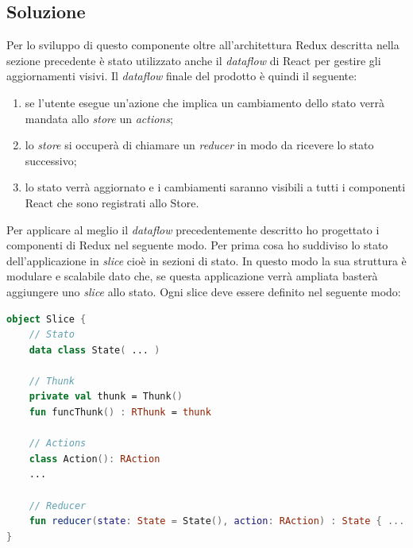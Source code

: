 \subsection{Soluzione}
Per lo sviluppo di questo componente oltre all'architettura Redux descritta nella sezione precedente è stato utilizzato anche il \emph{dataflow} di React per gestire gli aggiornamenti visivi. Il \emph{dataflow} finale del prodotto è quindi il seguente:
\begin{enumerate}
	\item se l'utente esegue un'azione che implica un cambiamento dello stato verrà mandata allo \emph{store} un \emph{actions};
	\item lo \emph{store} si occuperà di chiamare un \emph{reducer} in modo da ricevere lo stato successivo;
	\item lo stato verrà aggiornato e i cambiamenti saranno visibili a tutti i componenti React che sono registrati allo Store.
\end{enumerate}
Per applicare al meglio il \emph{dataflow} precedentemente descritto ho progettato i componenti di Redux nel seguente modo. Per prima cosa ho suddiviso lo stato dell'applicazione in \emph{slice} cioè in sezioni di stato. In questo modo la sua struttura è modulare e scalabile dato che, se questa applicazione verrà ampliata basterà aggiungere uno \emph{slice} allo stato. Ogni slice deve essere definito nel seguente modo:
\begin{lstlisting}[caption={Esempio Slice}, label={lst:slice_state}, language=Kotlin]
object Slice {
	// Stato
	data class State( ... )
	
	// Thunk
	private val thunk = Thunk()
	fun funcThunk() : RThunk = thunk
	
	// Actions
	class Action(): RAction
	...
	
	// Reducer
	fun reducer(state: State = State(), action: RAction) : State { ... }
}
\end{lstlisting}

